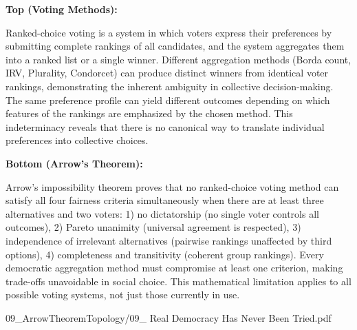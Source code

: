 \begin{SideNotePage}{
  \textbf{Top (Voting Methods):} \par Ranked-choice voting is a system in which voters express their preferences by submitting complete rankings of all candidates, and the system aggregates them into a ranked list or a single winner. Different aggregation methods (Borda count, IRV, Plurality, Condorcet) can produce distinct winners from identical voter rankings, demonstrating the inherent ambiguity in collective decision-making. The same preference profile can yield different outcomes depending on which features of the rankings are emphasized by the chosen method. This indeterminacy reveals that there is no canonical way to translate individual preferences into collective choices.


  \textbf{Bottom (Arrow's Theorem):} \par Arrow's impossibility theorem proves that no ranked-choice voting method can satisfy all four fairness criteria simultaneously when there are at least three alternatives and two voters: 1) no dictatorship (no single voter controls all outcomes), 2) Pareto unanimity (universal agreement is respected), 3) independence of irrelevant alternatives (pairwise rankings unaffected by third options), 4) completeness and transitivity (coherent group rankings). Every democratic aggregation method must compromise at least one criterion, making trade-offs unavoidable in social choice. This mathematical limitation applies to all possible voting systems, not just those currently in use.
}{09_ArrowTheoremTopology/09_ Real Democracy Has Never Been Tried.pdf}
\end{SideNotePage}